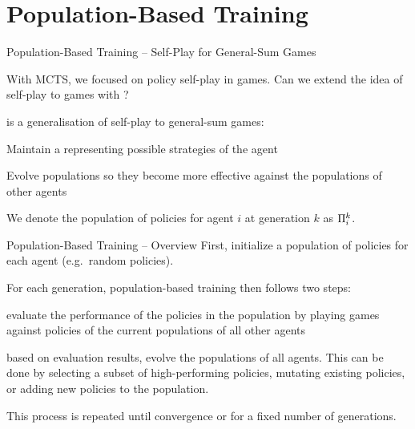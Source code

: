 \section{Population-Based Training}

\begin{frame}[t]{Population-Based Training -- Self-Play for General-Sum Games}
    \begin{problembox}
        With MCTS, we focused on policy self-play in  games. Can we extend the idea of self-play to  games with ?
    \end{problembox}

    \pause
    \vspace{1em}

     is a generalisation of self-play to general-sum games:
    \blist
        \item Maintain a  representing possible strategies of the agent
        \item Evolve populations so they become more effective against the populations of other agents
        \item We denote the population of policies for agent $i$ at generation $k$ as $\Pi_i^k$.
    \elist
\end{frame}

\begin{frame}[t]{Population-Based Training -- Overview}
    First, initialize a population of policies for each agent (e.g.\ random policies).\\

    \pause

    For each generation, population-based training then follows two steps:
    \blist
        \item {} evaluate the performance of the policies in the population by playing games against policies of the current populations of all other agents
        \item {} based on evaluation results, evolve the populations of all agents. This can be done by selecting a subset of high-performing policies, mutating existing policies, or adding new policies to the population.
    \elist

    \pause
    This process is repeated until convergence or for a fixed number of generations.
\end{frame}

